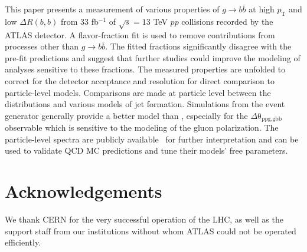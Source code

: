 \documentclass[PAPER, atlasdraft=true, texlive=2016, UKenglish,coverpage]{\ATLASLATEXPATH atlasdoc}
\begin{document}
This paper presents a measurement of various properties of $g\rightarrow b\bar{b}$ at high $p_\text{T}$ and low $\Delta R(b,b)$ from 33 fb$^{-1}$ of $\sqrt{s}=13$ TeV $pp$ collisions recorded by the ATLAS detector.  A flavor-fraction fit is used to remove contributions from processes other than $g\rightarrow b\bar{b}$.  The fitted fractions significantly disagree with the pre-fit \PYTHIA predictions and suggest that further studies could improve the modeling of analyses sensitive to these fractions.  The measured properties are unfolded to correct for the detector acceptance and resolution for direct comparison to particle-level models.  Comparisons are made at particle level between the distributions and various models of jet formation. Simulations from the \SHERPA event generator generally provide a better model than \PYTHIA, especially for the $\Delta\mathrm{\theta}_\text{ppg,gbb}$ observable which is sensitive to the modeling of the gluon polarization. The particle-level spectra are publicly available~\cite{hepdata} for further interpretation and can be used to validate QCD MC predictions and tune their models' free parameters.

\section*{Acknowledgements}


We thank CERN for the very successful operation of the LHC, as well as the
support staff from our institutions without whom ATLAS could not be
operated efficiently.
\end{document}
